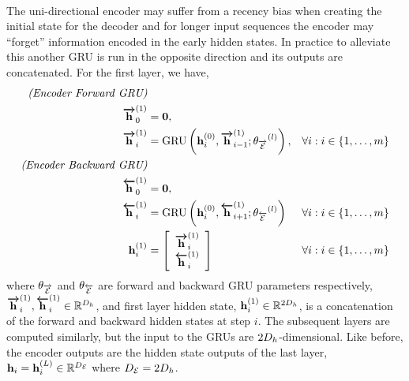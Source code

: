 \paragraph{}
The uni-directional encoder may suffer from a recency bias when creating the initial state for the 
decoder and for longer input sequences the encoder may ``forget'' information encoded in the 
early hidden states. In practice to alleviate this another GRU is run in the opposite direction and
its outputs are concatenated. For the first layer, we have,
\begin{align*}
    \textit{(Encoder Forward GRU)}\\
    {\boldsymbol{\overrightarrow{\mathbf{h}}}}_0^{(1)} & = \mathbf{0},\\ 
    {\boldsymbol{\overrightarrow{\mathbf{h}}}}_i^{(1)} & =\operatorname{GRU}\left(\mathbf{h}_i^{(0)}, {\boldsymbol{\overrightarrow{\mathbf{h}}}}_{i-1}^{(1)}; {\theta_{\overrightarrow{\mathcal{E}}}}^{(l)}\right), & \forall i : i \in \{1,\ldots, m\}\\
    \textit{(Encoder Backward GRU)}\\
     {\boldsymbol{\overleftarrow{\mathbf{h}}}}_0^{(1)} &= \mathbf{0}, \\
    {\boldsymbol{\overleftarrow{\mathbf{h}}}}_i^{(1)} & =\operatorname{GRU}\left(\mathbf{h}_i^{(0)}, {\boldsymbol{\overleftarrow{\mathbf{h}}}}_{i+1}^{(1)}; {\theta_{\overleftarrow{\mathcal{E}}}}^{(l)}\right)    & \forall i : i \in \{1,\ldots, m\}\\
  \mathbf{h}^{(1)}_i & = \left[\begin{array}{c} {\boldsymbol{\overrightarrow{\mathbf{h}}}}_i^{(1)} \\ {\boldsymbol{\overleftarrow{\mathbf{h}}}}_i^{(1)} \end{array}\right]
& \forall i : i \in \{1,\ldots, m\}\\
\end{align*}
where ${\theta_{\overrightarrow{\mathcal{E}}}}$ and ${\theta_{\overleftarrow{\mathcal{E}}}}$ are forward and backward GRU parameters respectively,
${\boldsymbol{\overrightarrow{\mathbf{h}}}}^{(1)}_i,{\boldsymbol{\overleftarrow{\mathbf{h}}}}^{(1)}_i\in\mathbb{R}^{D_{h}}$, and first layer hidden state,
$\mathbf{h}^{(1)}_i\in\mathbb{R}^{2D_{h}}$, is a concatenation of the forward and backward hidden
states at step $i$. 
The subsequent layers are computed similarly, but the input to the GRUs are $2D_{h}$-dimensional.
Like before, the encoder outputs are the hidden state outputs of the last layer, $\mathbf{h}_i = \mathbf{h}_i^{(L)} \in \mathbb{R}^{{D_\mathcal{E}}}$ where ${D_\mathcal{E}} = 2D_{h}$.


